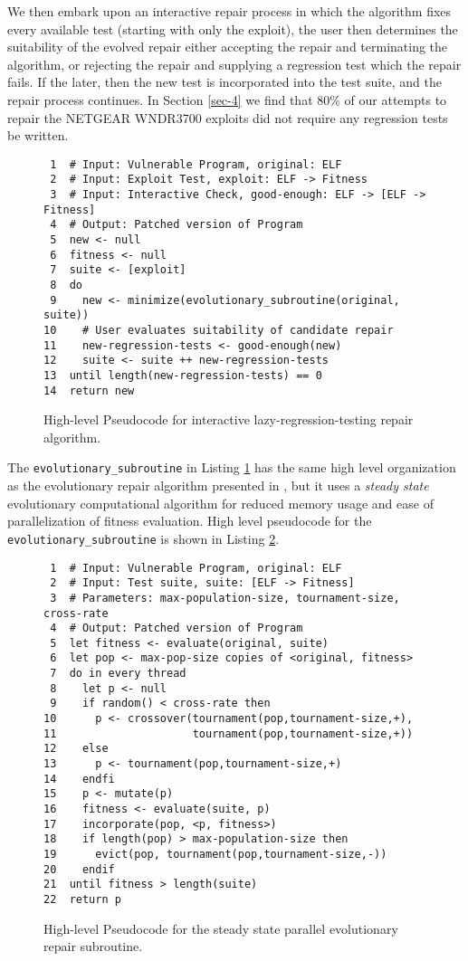 \documentclass{sigcomm-alternate}
\begin{document}
We then embark upon an interactive repair process in which the
algorithm fixes every available test (starting with only the exploit),
the user then determines the suitability of the evolved repair either
accepting the repair and terminating the algorithm, or rejecting the
repair and supplying a regression test which the repair fails.  If the
later, then the new test is incorporated into the test suite, and the
repair process continues.  In Section \ref{sec-4} we find that 80\% of our
attempts to repair the NETGEAR WNDR3700 exploits did not require any
regression tests be written.

\begin{figure}[H]
\begin{verbatim}
 1  # Input: Vulnerable Program, original: ELF
 2  # Input: Exploit Test, exploit: ELF -> Fitness
 3  # Input: Interactive Check, good-enough: ELF -> [ELF -> Fitness]
 4  # Output: Patched version of Program
 5  new <- null
 6  fitness <- null
 7  suite <- [exploit]
 8  do
 9    new <- minimize(evolutionary_subroutine(original, suite))
10    # User evaluates suitability of candidate repair
11    new-regression-tests <- good-enough(new)
12    suite <- suite ++ new-regression-tests
13  until length(new-regression-tests) == 0
14  return new
\end{verbatim}
\caption{\label{lazy-algorithm}High-level Pseudocode for interactive lazy-regression-testing repair algorithm.}
\end{figure}

The \texttt{evolutionary\_subroutine} in Listing \ref{lazy-algorithm} has the same
high level organization as the evolutionary repair algorithm presented
in \cite{forrest2009genetic}, but it uses a \emph{steady state} evolutionary
computational algorithm \cite{Luke2013Metaheuristics} for reduced memory
usage and ease of parallelization of fitness evaluation.  High level
pseudocode for the \texttt{evolutionary\_subroutine} is shown in Listing
\ref{evolutionary-subroutine}.

\begin{figure}[H]
\begin{verbatim}
 1  # Input: Vulnerable Program, original: ELF
 2  # Input: Test suite, suite: [ELF -> Fitness]
 3  # Parameters: max-population-size, tournament-size, cross-rate
 4  # Output: Patched version of Program
 5  let fitness <- evaluate(original, suite)
 6  let pop <- max-pop-size copies of <original, fitness>
 7  do in every thread
 8    let p <- null
 9    if random() < cross-rate then
10      p <- crossover(tournament(pop,tournament-size,+),
11                     tournament(pop,tournament-size,+))
12    else
13      p <- tournament(pop,tournament-size,+)
14    endfi
15    p <- mutate(p)
16    fitness <- evaluate(suite, p)
17    incorporate(pop, <p, fitness>)
18    if length(pop) > max-population-size then
19      evict(pop, tournament(pop,tournament-size,-))
20    endif
21  until fitness > length(suite)
22  return p
\end{verbatim}
\caption{\label{evolutionary-subroutine}High-level Pseudocode for the steady state parallel evolutionary repair subroutine.}

\end{figure}
\end{document}
